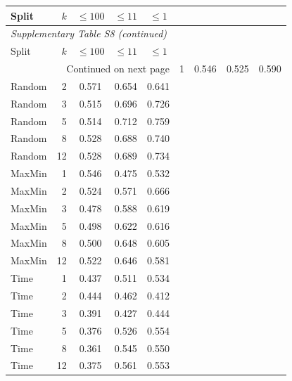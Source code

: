 \begingroup\small\setlength{\tabcolsep}{4pt}

\begin{longtable}{lrccc}

\toprule Split & $k$ & $\leq100$ & $\leq11$ & $\leq1$ \\ \midrule\endfirsthead

\multicolumn{5}{l}{\textit{Supplementary Table S8 (continued)}} \\

\toprule Split & $k$ & $\leq100$ & $\leq11$ & $\leq1$ \\ \midrule\endhead

\midrule\multicolumn{5}{r}{Continued on next page}\endfoot\bottomrule\endlastfoot

Random & 1 & 0.546 & 0.525 & 0.590 \\
Random & 2 & 0.571 & 0.654 & 0.641 \\
Random & 3 & 0.515 & 0.696 & 0.726 \\
Random & 5 & 0.514 & 0.712 & 0.759 \\
Random & 8 & 0.528 & 0.688 & 0.740 \\
Random & 12 & 0.528 & 0.689 & 0.734 \\
MaxMin & 1 & 0.546 & 0.475 & 0.532 \\
MaxMin & 2 & 0.524 & 0.571 & 0.666 \\
MaxMin & 3 & 0.478 & 0.588 & 0.619 \\
MaxMin & 5 & 0.498 & 0.622 & 0.616 \\
MaxMin & 8 & 0.500 & 0.648 & 0.605 \\
MaxMin & 12 & 0.522 & 0.646 & 0.581 \\
Time & 1 & 0.437 & 0.511 & 0.534 \\
Time & 2 & 0.444 & 0.462 & 0.412 \\
Time & 3 & 0.391 & 0.427 & 0.444 \\
Time & 5 & 0.376 & 0.526 & 0.554 \\
Time & 8 & 0.361 & 0.545 & 0.550 \\
Time & 12 & 0.375 & 0.561 & 0.553 \\

\end{longtable}\endgroup

